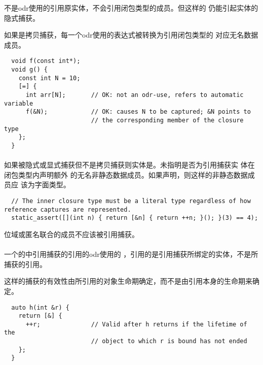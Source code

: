 \begin{note}
  不是odr使用的引用原实体，不会引用闭包类型的成员。但这样的
  仍能引起实体的隐式捕获。
\end{note}

如果是拷贝捕获，每一个odr使用的表达式被转换为引用闭包类型的
对应无名数据成员。

\begin{example}
  \begin{lstlisting}
  void f(const int*);
  void g() {
    const int N = 10;
    [=] {
      int arr[N];       // OK: not an odr-use, refers to automatic variable
      f(&N);            // OK: causes N to be captured; &N points to
                        // the corresponding member of the closure type
    };
  }
  \end{lstlisting}
\end{example}

\paragraph{} %
如果被隐式或显式捕获但不是拷贝捕获则实体是。未指明是否为引用捕获实
体在闭包类型内声明额外 的无名非静态数据成员。如果声明，则这样的非静态数据成员应
该为字面类型。

\begin{example}
  \begin{lstlisting}
  // The inner closure type must be a literal type regardless of how reference captures are represented.
  static_assert([](int n) { return [&n] { return ++n; }(); }(3) == 4);
  \end{lstlisting}
\end{example}

位域或匿名联合的成员不应该被引用捕获。

\paragraph{} %
一个的中引用捕获的引用的odr使用的
，引用的是引用捕获所绑定的实体，不是所捕获的引用。

\begin{note}
  这样的捕获的有效性由所引用的对象生命期确定，而不是由引用本身的生命期来确定。
\end{note}

\begin{example}
  \begin{lstlisting}
  auto h(int &r) {
    return [&] {
      ++r;              // Valid after h returns if the lifetime of the
                        // object to which r is bound has not ended
    };
  }
  \end{lstlisting}
\end{example}


